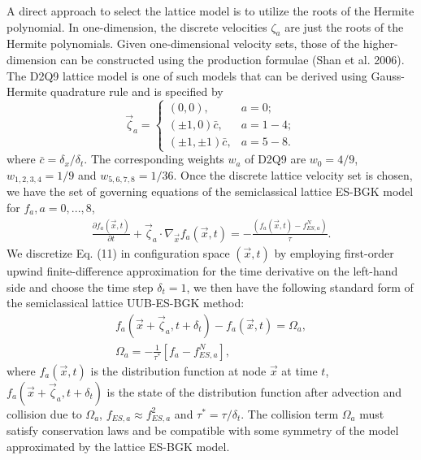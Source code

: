 \documentclass[doublecol]{epl2}
\begin{document}
A direct approach to select the lattice model is to utilize the roots of the Hermite polynomial. In one-dimension, the discrete velocities $\zeta_a$ are just the roots of the Hermite polynomials.  Given one-dimensional velocity sets, those of the higher-dimension can be constructed using the production formulae (Shan et al. 2006).  The D2Q9 lattice model is one of such models that can be derived using Gauss-Hermite quadrature rule and is specified by
\begin{equation}
\vec \zeta_a =
  \begin{cases}
   (0, 0), & a =0; \\
   (\pm 1, 0) \bar{c}, &  a=1-4; \\
   (\pm 1, \pm 1) \bar{c}, & a=5-8.
  \end{cases}
\end{equation}
where $\bar{c} = \delta_x/\delta_t$. The corresponding weights $w_a$ of D2Q9 are $w_0=4/9$, $w_{1,2,3,4}=1/9$ and $w_{5,6,7,8}=1/36$.
Once the discrete lattice velocity set is chosen, we have the set of governing equations of the semiclassical lattice ES-BGK model for $f_a, a=0, ..., 8$,
\begin{align}
\frac{\partial f_a (\vec x, t)}{\partial t} + \vec \zeta_a \cdot
\nabla_{\vec x} f_a( \vec x, t) =  -\frac{(f_a(\vec x, t) - f^{N}_{ES,a})}{\tau}.
\end{align}
We discretize Eq. (11) in configuration space $(\vec x,t)$ by employing first-order upwind finite-difference approximation for
the time derivative on the left-hand side and choose the time step $\delta_t = 1$, we then have the following standard form of the
semiclassical lattice UUB-ES-BGK method:
\begin{align}
f_a(\vec x+ \vec \zeta_a, t+\delta_t)- f_a(\vec x,t)=\Omega_a,\nonumber \\
\Omega_a = -\frac{1}{\tau^*}[f_a - f^{N}_{ES,a}],
\end{align}
where $f_a(\vec x,t)$ is the distribution function at node $\vec x$ at time $t$, $f_a(\vec x+ \vec \zeta_a, t+\delta_t)$ is the state of the distribution function after advection and collision due to $\Omega_a$, $f_{ES,a} \approx f_{ES,a}^{2}$ and $\tau^*= \tau/\delta_t$.  The collision term $\Omega_a$ must satisfy conservation laws and be compatible with some symmetry of the model approximated by the lattice ES-BGK model.
\end{document}
